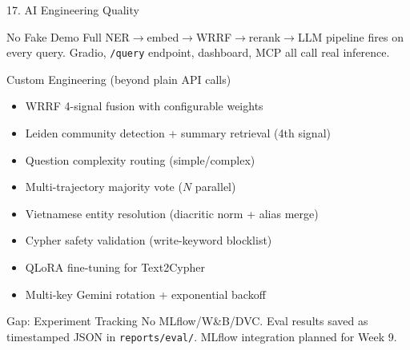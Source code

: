 \documentclass[aspectratio=169]{beamer}
\begin{document}
\begin{frame}[shrink=5]{17. AI Engineering Quality}
\begin{exampleblock}{No Fake Demo \checkmark}
{\small Full NER$\to$embed$\to$WRRF$\to$rerank$\to$LLM pipeline fires on every query.
Gradio, \texttt{/query} endpoint, dashboard, MCP all call real inference.}
\end{exampleblock}

\begin{block}{Custom Engineering (beyond plain API calls)}
\begin{itemize}\small\setlength\itemsep{1pt}
  \item WRRF 4-signal fusion with configurable weights
  \item Leiden community detection + summary retrieval (4th signal)
  \item Question complexity routing (simple/complex)
  \item Multi-trajectory majority vote ($N$ parallel)
  \item Vietnamese entity resolution (diacritic norm + alias merge)
  \item Cypher safety validation (write-keyword blocklist)
  \item QLoRA fine-tuning for Text2Cypher
  \item Multi-key Gemini rotation + exponential backoff
\end{itemize}
\end{block}

\begin{alertblock}{Gap: Experiment Tracking}
{\small No MLflow/W\&B/DVC. Eval results saved as timestamped JSON in
\texttt{reports/eval/}. MLflow integration planned for Week 9.}
\end{alertblock}
\end{frame}
\fi
\end{document}
